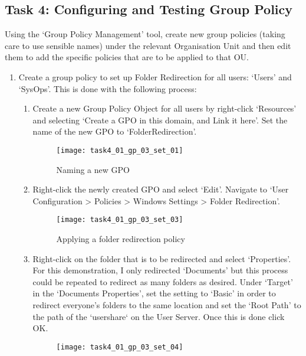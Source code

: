 \pagebreak
\subsection{Task 4: Configuring and Testing Group Policy}
Using the `Group Policy Management' tool, create new group policies (taking care to use sensible names) under the relevant Organisation Unit and then edit them to add the specific policies that are to be applied to that OU.

\begin{enumerate}[series=task4methodology1]
  \item Create a group policy to set up Folder Redirection for all users: `Users' and `SysOps'. This is done with the following process:
    \begin{enumerate}[label=(\alph*)]
      \item Create a new Group Policy Object for all users by right-click `Resources' and selecting `Create a GPO in this domain, and Link it here'. Set the name of the new GPO to `FolderRedirection'.
        \begin{figure}[H]
          \centering
          \captionsetup{skip=2pt}
          \texttt{[image: task4\_01\_gp\_03\_set\_01]}
          \caption{Naming a new GPO}
          \label{fig:task4:gp3a1}
        \end{figure}
      \item Right-click the newly created GPO and select `Edit'. Navigate to `User Configuration > Policies > Windows Settings > Folder Redirection'.
        \begin{figure}[H]
          \centering
          \captionsetup{skip=2pt}
          \texttt{[image: task4\_01\_gp\_03\_set\_03]}
          \caption{Applying a folder redirection policy}
          \label{fig:task4:gp3a3}
        \end{figure}
      \item Right-click on the folder that is to be redirected and select `Properties'. For this demonstration, I only redirected `Documents' but this process could be repeated to redirect as many folders as desired. Under `Target' in the `Documents Properties', set the setting to `Basic' in order to redirect everyone's folders to the same location and set the `Root Path' to the path of the `usershare` on the User Server. Once this is done click OK.
        \begin{figure}[H]
          \centering
          \captionsetup{skip=2pt}
          \texttt{[image: task4\_01\_gp\_03\_set\_04]}

\end{figure}
\end{enumerate}
\end{enumerate}
